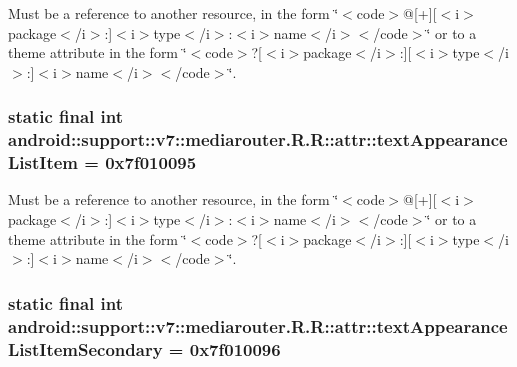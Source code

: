 Must be a reference to another resource, in the form \char`\"{}$<$code$>$@\mbox{[}+\mbox{]}\mbox{[}$<$i$>$package$<$/i$>$:\mbox{]}$<$i$>$type$<$/i$>$:$<$i$>$name$<$/i$>$$<$/code$>$\char`\"{} or to a theme attribute in the form \char`\"{}$<$code$>$?\mbox{[}$<$i$>$package$<$/i$>$:\mbox{]}\mbox{[}$<$i$>$type$<$/i$>$:\mbox{]}$<$i$>$name$<$/i$>$$<$/code$>$\char`\"{}. \hypertarget{classandroid_1_1support_1_1v7_1_1mediarouter_1_1_r_1_1attr_bc4596cc117548b5cc838800857ec0b3}{
\subsubsection[{textAppearanceListItem}]{\setlength{\rightskip}{0pt plus 5cm}static final int android::support::v7::mediarouter.R.R::attr::textAppearanceListItem = 0x7f010095}}
\label{classandroid_1_1support_1_1v7_1_1mediarouter_1_1_r_1_1attr_bc4596cc117548b5cc838800857ec0b3}


Must be a reference to another resource, in the form \char`\"{}$<$code$>$@\mbox{[}+\mbox{]}\mbox{[}$<$i$>$package$<$/i$>$:\mbox{]}$<$i$>$type$<$/i$>$:$<$i$>$name$<$/i$>$$<$/code$>$\char`\"{} or to a theme attribute in the form \char`\"{}$<$code$>$?\mbox{[}$<$i$>$package$<$/i$>$:\mbox{]}\mbox{[}$<$i$>$type$<$/i$>$:\mbox{]}$<$i$>$name$<$/i$>$$<$/code$>$\char`\"{}. \hypertarget{classandroid_1_1support_1_1v7_1_1mediarouter_1_1_r_1_1attr_14a22cfd59eb911c90b285ace4274217}{
\subsubsection[{textAppearanceListItemSecondary}]{\setlength{\rightskip}{0pt plus 5cm}static final int android::support::v7::mediarouter.R.R::attr::textAppearanceListItemSecondary = 0x7f010096}}
\label{classandroid_1_1support_1_1v7_1_1mediarouter_1_1_r_1_1attr_14a22cfd59eb911c90b285ace4274217}


